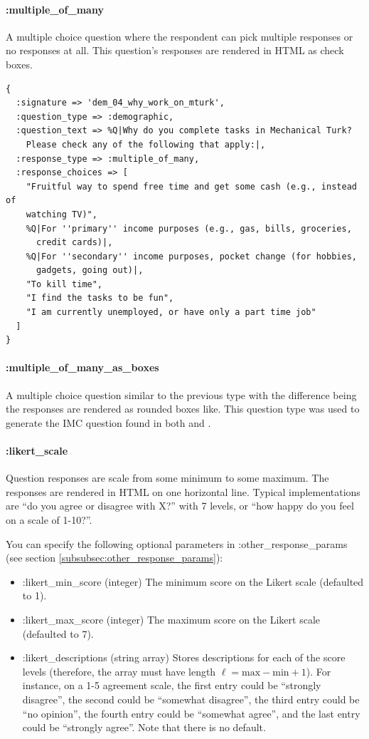 \documentclass[12pt]{article}
\begin{document}
\paragraph{:multiple\_of\_many}

A multiple choice question where the respondent can pick multiple responses or no responses at all. This question's responses are rendered in HTML as check boxes.

\begin{verbatim}
{
  :signature => 'dem_04_why_work_on_mturk',
  :question_type => :demographic,
  :question_text => %Q|Why do you complete tasks in Mechanical Turk? 
    Please check any of the following that apply:|,
  :response_type => :multiple_of_many,
  :response_choices => [
    "Fruitful way to spend free time and get some cash (e.g., instead of 
    watching TV)",
    %Q|For ''primary'' income purposes (e.g., gas, bills, groceries, 
      credit cards)|,
    %Q|For ''secondary'' income purposes, pocket change (for hobbies, 
      gadgets, going out)|,
    "To kill time",
    "I find the tasks to be fun",
    "I am currently unemployed, or have only a part time job"
  ]
}
\end{verbatim}
\paragraph{:multiple\_of\_many\_as\_boxes}

A multiple choice question similar to the previous type with the difference being the responses are rendered as rounded boxes like. This question type was used to generate the IMC question found in both \citet{KapelnerChandler2010} and \citet{Opp09}.

\paragraph{:likert\_scale}

Question responses are scale from some minimum to some maximum. The responses are rendered in HTML on one horizontal line. Typical implementations are ``do you agree or disagree with X?'' with 7 levels, or ``how happy do you feel on a scale of 1-10?''.

You can specify the following optional parameters in :other\_response\_params (see section \ref{subsubsec:other_response_params}):

\begin{itemize}
\item :likert\_min\_score (integer) \quad The minimum score on the Likert scale (defaulted to 1).
\item :likert\_max\_score (integer) \quad The maximum score on the Likert scale (defaulted to 7).
\item :likert\_descriptions (string array) \quad Stores descriptions for each of the score levels (therefore, the array must have length $\ell = \mathrm{max} - \mathrm{min} + 1$). For instance, on a 1-5 agreement scale, the first entry could be ``strongly disagree'', the second could be ``somewhat disagree'', the third entry could be ``no opinion'', the fourth entry could be ``somewhat agree'', and the last entry could be ``strongly agree''. Note that there is no default.
\end{itemize}
\end{document}
